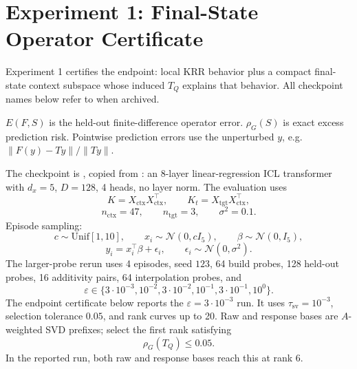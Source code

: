 \documentclass[11pt]{article}
\begin{document}
\section{Experiment 1: Final-State Operator Certificate}

Experiment 1 certifies the endpoint: local KRR behavior plus a compact final-state context subspace
whose induced \(T_Q\) explains that behavior. All checkpoint names below refer to
 when archived.

\(E(F,S)\) is the held-out finite-difference operator error. \(\rho_G(S)\) is exact excess
prediction risk. Pointwise prediction errors use the unperturbed \(y\), e.g.
\(\|F(y)-Ty\|/\|Ty\|\).

The checkpoint is , copied from : an
8-layer linear-regression ICL transformer with \(d_x=5\), \(D=128\), 4 heads, no layer norm. The
evaluation uses
\[
K=X_{\mathrm{ctx}}X_{\mathrm{ctx}}^\top,
\qquad
K_t=X_{\mathrm{tgt}}X_{\mathrm{ctx}}^\top,
\]
\[
n_{\mathrm{ctx}}=47,\qquad
n_{\mathrm{tgt}}=3,\qquad
\sigma^2=0.1.
\]
Episode sampling:
\[
c\sim\mathrm{Unif}[1,10],
\qquad
x_i\sim\mathcal{N}(0,cI_5),
\qquad
\beta\sim\mathcal{N}(0,I_5),
\]
\[
y_i=x_i^\top\beta+\epsilon_i,
\qquad
\epsilon_i\sim\mathcal{N}(0,\sigma^2).
\]
The larger-probe rerun uses 4 episodes, seed \(123\), 64 build probes, 128 held-out probes,
16 additivity pairs, 64 interpolation probes, and
\[
\varepsilon\in\{3\cdot10^{-3},10^{-2},3\cdot10^{-2},10^{-1},3\cdot10^{-1},10^0\}.
\]
The endpoint certificate below reports the \(\varepsilon=3\cdot10^{-3}\) run. It uses
\(\tau_{\mathrm{sv}}=10^{-3}\), selection tolerance \(0.05\), and rank curves up to 20. Raw and
response bases are \(A\)-weighted SVD prefixes; select the first rank satisfying
\[
\rho_G(T_Q)\le0.05.
\]
In the reported run, both raw and response bases reach this at rank \(6\).
\end{document}
